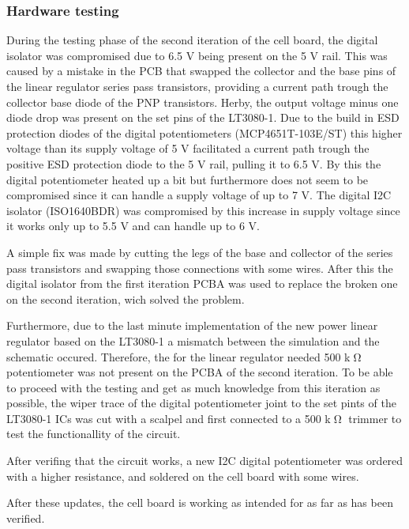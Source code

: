 \subsubsection{Hardware testing}
During the testing phase of the second iteration of the cell board, the digital isolator was compromised due to 6.5 V being present on the 5 V rail. This was caused by a mistake in the PCB that swapped the collector and the base pins of the linear regulator series pass transistors, providing a current path trough the collector base diode of the PNP transistors. Herby, the output voltage minus one diode drop was present on the set pins of the LT3080-1. Due to the build in ESD protection diodes of the digital potentiometers (MCP4651T-103E/ST) this higher voltage than its supply voltage of 5 V facilitated a current path trough the positive ESD protection diode to the 5 V rail, pulling it to 6.5 V. By this the digital potentiometer heated up a bit but furthermore does not seem to be compromised since it can handle a supply voltage of up to 7 V. The digital I2C isolator (ISO1640BDR) was compromised by this increase in supply voltage since it works only up to 5.5 V and can handle up to 6 V. 

A simple fix was made by cutting the legs of the base and collector of the series pass transistors and swapping those connections with some wires. After this the digital isolator from the first iteration PCBA was used to replace the broken one on the second iteration, wich solved the problem.

Furthermore, due to the last minute implementation of the new power linear regulator based on the LT3080-1 a mismatch between the simulation and the schematic occured. Therefore, the for the linear regulator needed 500 k$\tcohm$ potentiometer was not present on the PCBA of the second iteration. To be able to proceed with the testing and get as much knowledge from this iteration as possible, the wiper trace of the digital potentiometer joint to the set pints of the LT3080-1 ICs was cut with a scalpel and first connected to a 500 k$\tcohm$ trimmer to test the functionallity of the circuit.

After verifing that the circuit works, a new I2C digital potentiometer was ordered with a higher resistance, and soldered on the cell board with some wires.

After these updates, the cell board is working as intended for as far as has been verified.